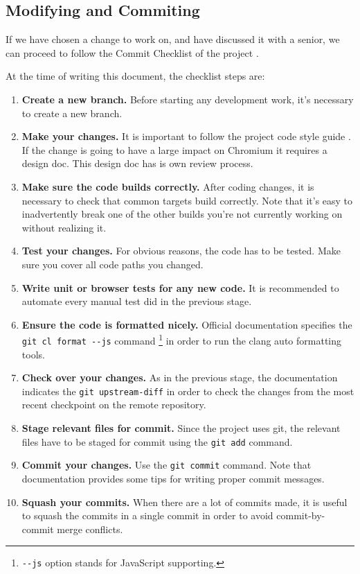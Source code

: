 \subsection{Modifying and Commiting}

If we have chosen a change to work on, and have discussed it with a senior, we can proceed to follow the Commit Checklist of the project \cite{checklist}.

At the time of writing this document, the checklist steps are:
\begin{enumerate}
    \item \textbf{Create a new branch.} Before starting any development work, it's necessary to create a new branch.
    \item \textbf{Make your changes.} It is important to follow the project code style guide \cite{style_guide}. If the change is going to have a large impact on Chromium it requires a design doc. This design doc has is own review process.
    \item \textbf{Make sure the code builds correctly.} After coding changes, it is necessary to check that common targets build correctly. Note that it's easy to inadvertently break one of the other builds you're not currently working on without realizing it.
    \item \textbf{Test your changes.} For obvious reasons, the code has to be tested. Make sure you cover all code paths you changed.
    \item \textbf{Write unit or browser tests for any new code.} It is recommended to automate every manual test did in the previous stage.
    \item \textbf{Ensure the code is formatted nicely.} Official documentation specifies the \texttt{git cl format {-}{-}js} command \footnote{\texttt{{-}{-}js} option stands for JavaScript supporting.} in order to run the clang auto formatting tools.
    \item \textbf{Check over your changes.} As in the previous stage, the documentation indicates the \texttt{git upstream-diff} in order to check the changes from the most recent checkpoint on the remote repository.
    \item \textbf{Stage relevant files for commit.} Since the project uses git, the relevant files have to be staged for commit using the \texttt{git add} command.
    \item \textbf{Commit your changes.} Use the \texttt{git commit} command. Note that documentation provides some tips for writing proper commit messages.
    \item \textbf{Squash your commits.} When there are a lot of commits made, it is useful to squash the commits in a single commit in order to avoid commit-by-commit merge conflicts.

\end{enumerate}
